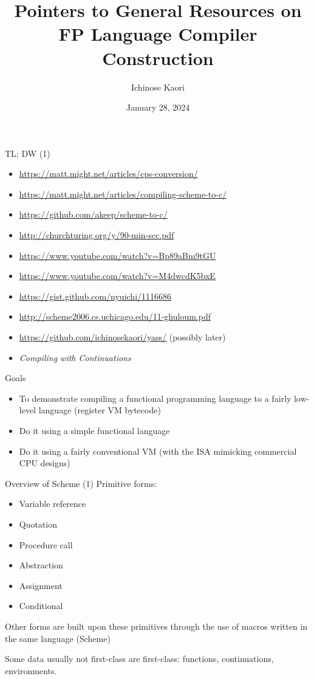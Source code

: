 \documentclass{beamer}
\title[FP Compilers]{Pointers to General Resources on FP Language Compiler Construction}
\author{Ichinose Kaori}
\date{January 28, 2024}
\begin{document}
\maketitle

\begin{frame}{TL; DW (1)}
  \begin{itemize}
  \item \url{https://matt.might.net/articles/cps-conversion/}
  \item \url{https://matt.might.net/articles/compiling-scheme-to-c/}
  \item \url{https://github.com/akeep/scheme-to-c/}
  \item \url{http://churchturing.org/y/90-min-scc.pdf}
  \item \url{https://www.youtube.com/watch?v=Bp89aBm9tGU}
  \item \url{https://www.youtube.com/watch?v=M4dwcdK5bxE}
  \item \url{https://gist.github.com/nyuichi/1116686}
  \item \url{http://scheme2006.cs.uchicago.edu/11-ghuloum.pdf}
  \item \url{https://github.com/ichinosekaori/yass/} (possibly later)
  \item \textit{Compiling with Continuations}
  \end{itemize}
\end{frame}

\begin{frame}{Goals}
  \begin{itemize}
    \item To demonstrate compiling a functional programming language to a fairly low-level language (register VM bytecode)
    \item Do it using a simple functional language
    \item Do it using a fairly conventional VM (with the ISA mimicking commercial CPU designs)
  \end{itemize}
\end{frame}

\begin{frame}{Overview of Scheme (1)}
  Primitive forms:
  \begin{itemize}
  \item Variable reference
  \item Quotation
  \item Procedure call
  \item Abstraction
  \item Assignment
  \item Conditional
  \end{itemize}

  Other forms are built upon these primitives through the use of macros written in the same language (Scheme)

  Some data usually not first-class are first-class: functions, continuations, environments. 
\end{frame}
\end{document}
